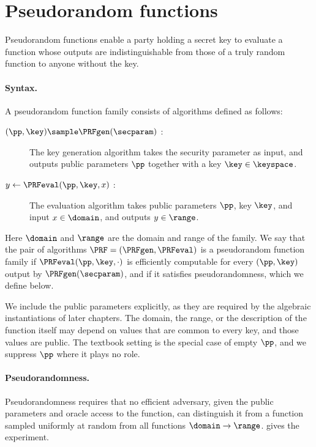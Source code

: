 \section{Pseudorandom functions}\label{sec:prelims-prfs}

Pseudorandom functions enable a party holding a secret key to evaluate a
function whose outputs are indistinguishable from those of a truly random
function to anyone without the key.

\paragraph{Syntax.} A pseudorandom function family consists of algorithms
defined as follows:
%
\begin{description}

  \item[$(\pp, \key) \sample \PRFgen(\secparam)$ :] The key generation algorithm
takes the security parameter as input, and outputs public parameters $\pp$
together with a key $\key \in \keyspace$.

  \item[$y \leftarrow \PRFeval(\pp, \key, x)$ :] The evaluation algorithm takes
public parameters $\pp$, key $\key$, and input $x \in \domain$, and outputs
$y \in \range$.

\end{description}
%
Here $\domain$ and $\range$ are the domain and range of the family. We say
that the pair of algorithms $\PRF = (\PRFgen, \PRFeval)$ is a pseudorandom
function family if $\PRFeval(\pp, \key, \cdot)$ is
efficiently computable for every $(\pp, \key)$ output by $\PRFgen(\secparam)$,
and if it satisfies pseudorandomness, which we define below.

We include the public parameters explicitly, as they are required by the
algebraic instantiations of later chapters. The domain, the range, or the
description of the function itself may depend on values that are common to every
key, and those values are public. The textbook setting is the special
case of empty $\pp$, and we suppress $\pp$ where it plays no role.

\paragraph{Pseudorandomness.} Pseudorandomness requires that no efficient
adversary, given the public parameters and oracle access to the function, can
distinguish it from a function sampled uniformly at random from all functions
$\domain \to \range$.  gives the experiment.

